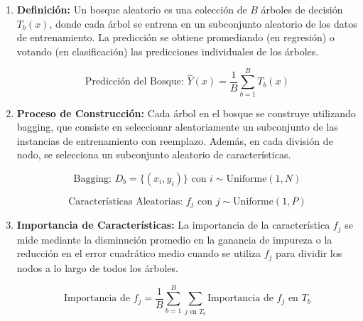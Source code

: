 \documentclass[12pt]{article}
\begin{document}
\begin{enumerate}
    \item \textbf{Definición:}
        Un bosque aleatorio es una colección de \(B\) árboles de decisión \(T_b(x)\), donde cada árbol se entrena en un subconjunto aleatorio de los datos de entrenamiento. La predicción se obtiene promediando (en regresión) o votando (en clasificación) las predicciones individuales de los árboles.

        \[ \textrm{Predicción del Bosque: } \hat{Y}(x) = \frac{1}{B} \sum_{b=1}^{B} T_b(x) \]

    \item \textbf{Proceso de Construcción:}
        Cada árbol en el bosque se construye utilizando bagging, que consiste en seleccionar aleatoriamente un subconjunto de las instancias de entrenamiento con reemplazo. Además, en cada división de nodo, se selecciona un subconjunto aleatorio de características.

        \[ \textrm{Bagging: } D_b = \{(x_i, y_i)\} \textrm{ con } i \sim \textrm{Uniforme}(1, N) \]

        \[ \textrm{Características Aleatorias: } f_j \textrm{ con } j \sim \textrm{Uniforme}(1, P) \]

    \item \textbf{Importancia de Características:}
        La importancia de la característica \(f_j\) se mide mediante la disminución promedio en la ganancia de impureza o la reducción en el error cuadrático medio cuando se utiliza \(f_j\) para dividir los nodos a lo largo de todos los árboles.

        \[ \textrm{Importancia de } f_j = \frac{1}{B} \sum_{b=1}^{B} \sum_{j \textrm{ en } T_b} \textrm{Importancia de } f_j \textrm{ en } T_b \]

\end{enumerate}
\end{document}

